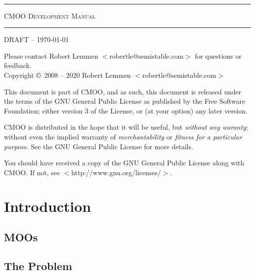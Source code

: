 \documentclass[12pt,a4paper]{article}
\let\oldsection\section
\renewcommand\section{\clearpage\oldsection}
\begin{document}
\thispagestyle{empty}
~\vspace{141pt}
\begin{center}
\rule{\textwidth}{1pt}\vspace{20pt}
{\Huge\scshape CMOO Development Manual}\vspace{8pt}
\rule{\textwidth}{1pt}
\end{center}
\clearpage

\thispagestyle{empty}
DRAFT -- \today

Please contact Robert Lemmen $<$robertle@semistable.com$>$ for questions or
feedback.
\\
Copyright \copyright~2008 -- 2020 Robert Lemmen $<$robertle@semistable.com$>$

This document is part of CMOO, and as such, this document is released under the terms of the GNU General Public License as published by the Free Software Foundation; either version 3 of the License, or (at your option) any later version.

CMOO is distributed in the hope that it will be useful, but {\em without any
waranty}; without even the implied warranty of {\em merchantability} or {\em
fitness for a particular purpose}.  See the GNU General Public License for more details.

You should have received a copy of the GNU General Public License along with CMOO. If not, see $<$http://www.gnu.org/licenses/$>$.
\cleardoublepage

\tableofcontents
\cleardoublepage

\section{Introduction}\label{sec:introduction}


\subsection{MOOs}


\subsection{The Problem}

\end{document}
